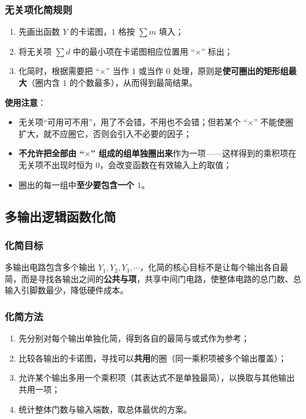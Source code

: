 \subsubsection{无关项化简规则}
\begin{enumerate}
    \item 先画出函数 $Y$ 的卡诺图，$1$ 格按 $\sum m$ 填入；
    \item 将无关项 $\sum d$ 中的最小项在卡诺图相应位置用 ``$\times$'' 标出；
    \item 化简时，根据需要把 ``$\times$'' 当作 $1$ 或当作 $0$ 处理，原则是\textbf{使可圈出的矩形组最大}（圈内含 $1$ 的个数最多），从而得到最简结果。
\end{enumerate}

\textbf{使用注意}：
\begin{itemize}
    \item 无关项``可用可不用''，用了不会错，不用也不会错；但若某个 ``$\times$'' 不能使圈扩大，就不应圈它，否则会引入不必要的因子；
    \item \textbf{不允许把全部由 ``$\times$'' 组成的组单独圈出来}作为一项——这样得到的乘积项在无关项不出现时恒为 $0$，会改变函数在有效输入上的取值；
    \item 圈出的每一组中\textbf{至少要包含一个 $1$}。
\end{itemize}

\subsection{多输出逻辑函数化简}
\subsubsection{化简目标}
多输出电路包含多个输出 $Y_1,Y_2,Y_3,\cdots$，化简的核心目标不是让每个输出各自最简，而是寻找各输出之间的\textbf{公共与项}，共享中间门电路，使整体电路的总门数、总输入引脚数最少，降低硬件成本。

\subsubsection{化简方法}
\begin{enumerate}
    \item 先分别对每个输出单独化简，得到各自的最简与或式作为参考；
    \item 比较各输出的卡诺图，寻找可以\textbf{共用}的圈（同一乘积项被多个输出覆盖）；
    \item 允许某个输出多用一个乘积项（其表达式不是单独最简），以换取与其他输出共用一项；
    \item 统计整体门数与输入端数，取总体最优的方案。
\end{enumerate}

